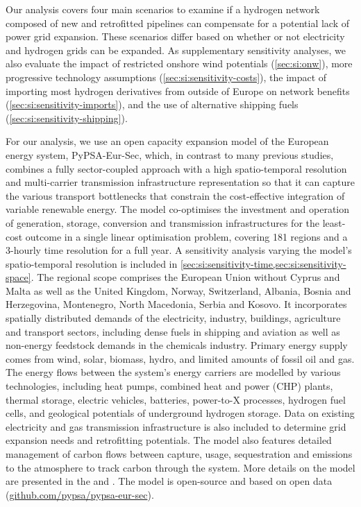 Our analysis covers four main scenarios to examine if a hydrogen network
composed of new and retrofitted pipelines can compensate for a potential lack of
power grid expansion. These scenarios differ based on whether or not electricity
and hydrogen grids can be expanded. As supplementary sensitivity analyses, we
also evaluate the impact of restricted onshore wind potentials
(\cref{sec:si:onw}), more progressive technology assumptions
(\cref{sec:si:sensitivity-costs}), the impact of importing most hydrogen
derivatives from outside of Europe on network benefits (\cref{sec:si:sensitivity-imports}), and the use
of alternative shipping fuels (\cref{sec:si:sensitivity-shipping}).

For our analysis, we use an open capacity expansion model of the European energy
system, PyPSA-Eur-Sec, which, in contrast to many previous studies,
\cite{henningComprehensiveModel2014,mathiesenSmartEnergy2015,connollySmartEnergy2016,Loffler_2019,blancoPotentialHydrogen2018,brownSynergiesSector2018,in-depth_2018,victoria2020,ludererImpactDeclining2021,gea-bermudezRoleSector2021}
combines a fully sector-coupled approach with a high spatio-temporal resolution
and multi-carrier transmission infrastructure representation so that it can
capture the various transport bottlenecks that constrain the cost-effective
integration of variable renewable energy.\cite{frysztackiStrongEffect2021} The
model co-optimises the investment and operation of generation, storage,
conversion and transmission infrastructures for the least-cost outcome in a
single linear optimisation problem, covering 181 regions and a 3-hourly time
resolution for a full year. A sensitivity analysis varying the model's
spatio-temporal resolution is included in
\cref{sec:si:sensitivity-time,sec:si:sensitivity-space}. The regional scope
comprises the European Union without Cyprus and Malta as well as the United Kingdom,
Norway, Switzerland, Albania, Bosnia and Herzegovina, Montenegro, North
Macedonia, Serbia and Kosovo. It incorporates spatially distributed demands of
the electricity, industry, buildings, agriculture and transport sectors,
including dense fuels in shipping and aviation as well as non-energy feedstock
demands in the chemicals industry. Primary energy supply comes from wind, solar,
biomass, hydro, and limited amounts of fossil oil and gas. The energy flows
between the system's energy carriers are modelled by various technologies,
including heat pumps, combined heat and power (CHP) plants, thermal storage,
electric vehicles, batteries, power-to-X processes, hydrogen fuel cells, and geological
potentials of underground hydrogen storage. Data on existing electricity and gas
transmission infrastructure is also included to determine grid expansion needs
and retrofitting potentials. The model also features detailed management of
carbon flows between capture, usage, sequestration and emissions to the
atmosphere to track carbon through the system. More details on the model are
presented in the  and . The model is
open-source and based on open data
(\href{https://github.com/pypsa/pypsa-eur-sec}{github.com/pypsa/pypsa-eur-sec}).


